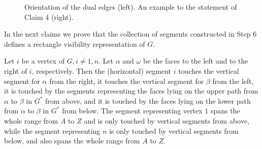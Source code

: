 \begin{figure}[!ht]
	\begin{subfigure}{0.45\textwidth}\centering
	\end{subfigure}
	\begin{subfigure}{0.45\textwidth}\centering
	\end{subfigure}
	\caption{Orientation of the dual edges (left). An example to the statement of Claim 4 (right).}
	\label{fig-3}
\end{figure}

In the next claims we prove that the collection of segments constructed in Step 6 defines a rectangle visibility representation of $G$.

\begin{claim}
	Let $i$ be a vertex of $G, i \neq 1, n$. Let $\alpha$ and $\omega$ be the faces to the left and to the right of $i$, respectively. Then the (horizontal) segment $i$ touches the vertical segment for $\alpha$ from the right, it touches the vertical segment for $\beta$ from the left, it is touched by the segments representing the faces lying on the upper path from $\alpha$ to $\beta$ in $G^\ast$ from above, and it is touched by the faces lying on the lower path from $\alpha$ to $\beta$ in $G^\ast$ from below. The segment representing vertex $1$ spans the whole range from $A$ to $Z$ and is only touched by vertical segments from above, while the segment representing $n$ is only touched by vertical segments from below, and also spans the whole range from $A$ to $Z$.
	\label{claim-5}
\end{claim}

